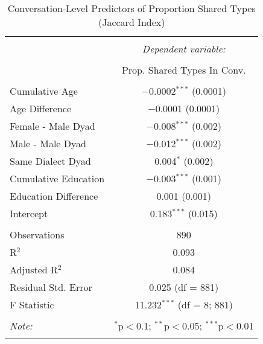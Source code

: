 
\begin{table}[!htbp] \centering 
  \caption{Conversation-Level Predictors of Proportion Shared Types (Jaccard Index)} 
  \label{dyadRegression} 
\begin{tabular}{@{\extracolsep{5pt}}lc} 
\\[-1.8ex]\hline 
\hline \\[-1.8ex] 
 & \multicolumn{1}{c}{\textit{Dependent variable:}} \\ 
\cline{2-2} 
\\[-1.8ex] & Prop. Shared Types In Conv. \\ 
\hline \\[-1.8ex] 
 Cumulative Age & $-$0.0002$^{***}$ (0.0001) \\ 
  Age Difference & $-$0.0001 (0.0001) \\ 
  Female - Male Dyad & $-$0.008$^{***}$ (0.002) \\ 
  Male - Male Dyad & $-$0.012$^{***}$ (0.002) \\ 
  Same Dialect Dyad & 0.004$^{*}$ (0.002) \\ 
  Cumulative Education & $-$0.003$^{***}$ (0.001) \\ 
  Education Difference & 0.001 (0.001) \\ 
  Intercept & 0.183$^{***}$ (0.015) \\ 
 \hline \\[-1.8ex] 
Observations & 890 \\ 
R$^{2}$ & 0.093 \\ 
Adjusted R$^{2}$ & 0.084 \\ 
Residual Std. Error & 0.025 (df = 881) \\ 
F Statistic & 11.232$^{***}$ (df = 8; 881) \\ 
\hline 
\hline \\[-1.8ex] 
\textit{Note:}  & \multicolumn{1}{r}{$^{*}$p$<$0.1; $^{**}$p$<$0.05; $^{***}$p$<$0.01} \\ 
\normalsize 
\end{tabular} 
\end{table} 

